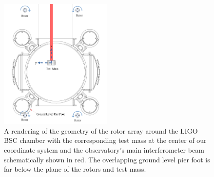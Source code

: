 \documentclass[superscriptaddress, twocolumn, prd]{revtex4-1}
\begin{document}
%
%
%

\begin{figure}[!h]
\centering \includegraphics[width=0.5\textwidth]{Super4BSCTopDownAxesSpinNew.pdf}
\caption{A rendering of the geometry of the rotor array around the LIGO BSC chamber with the corresponding test mass at the center of our coordinate system and the observatory's main interferometer beam schematically shown in red. The overlapping ground level pier foot is far below the plane of the rotors and test mass.}
\label{bsc} 
\end{figure}
\end{document}
